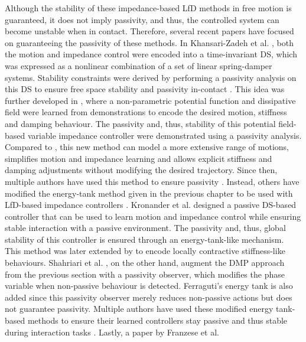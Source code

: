 Although the stability of these impedance-based LfD methods in free motion is guaranteed, it does not imply passivity, and thus, the controlled system can become unstable when in contact. Therefore, several recent papers have focused on guaranteeing the passivity of these methods. In Khansari-Zadeh et al. \cite{khansari-zadehModelingRobotDiscrete2014}, both the motion and impedance control were encoded into a time-invariant DS, which was expressed as a nonlinear combination of a set of linear spring-damper systems. Stability constraints were derived by performing a passivity analysis on this DS to ensure free space stability and passivity in-contact \cite{khansari-zadehModelingRobotDiscrete2014}. This idea was further developed in \cite{khansari-zadehLearningPotentialFunctions2017}, where a non-parametric potential function and dissipative field were learned from demonstrations to encode the desired motion, stiffness and damping behaviour. The passivity and, thus, stability of this potential field-based variable impedance controller were demonstrated using a passivity analysis. Compared to \cite{khansari-zadehModelingRobotDiscrete2014}, this new method can model a more extensive range of motions, simplifies motion and impedance learning and allows explicit stiffness and damping adjustments without modifying the desired trajectory. Since then, multiple authors have used this method to ensure passivity \cite{wilzConstrainedHapticguidedShared2021,rossaRoboticRehabilitationAssistance2021,najafiUsingPotentialField2020,baiReachableWorkspaceRobotassisted2022,huFuzzyAdaptivePassive2023}. Instead, others have modified the energy-tank method given in the previous chapter to be used with LfD-based impedance controllers \cite{kronanderPassiveInteractionControl2016,shahriariAdaptingContactsEnergy2017}. Kronander et al. \cite{kronanderPassiveInteractionControl2016} designed a passive DS-based controller that can be used to learn motion and impedance control while ensuring stable interaction with a passive environment. The passivity and, thus, global stability of this controller is ensured through an energy-tank-like mechanism. This method was later extended by \cite{figueroaLocallyActiveGlobally2022,chenClosedLoopVariableStiffness2021} to encode locally contractive stiffness-like behaviours. Shahriari et al. \cite{shahriariAdaptingContactsEnergy2017}, on the other hand, augment the DMP approach from the previous section with a passivity observer, which modifies the phase variable when non-passive behaviour is detected. Ferraguti's energy tank is also added since this passivity observer merely reduces non-passive actions but does not guarantee passivity. Multiple authors have used these modified energy tank-based methods to ensure their learned controllers stay passive and thus stable during interaction tasks \cite{kastritsiPHRIFrameworkModifying2018,kastritsiProgressiveAutomationDMP2018,dimeasProgressiveAutomationPeriodic2020,papageorgiouKinestheticGuidanceUtilizing2020,krambergerPassivityBasedIterative2018,amanhoudDynamicalSystemApproach2019,enayatiVariableImpedanceForceControl2020,michelBilateralTeleoperationAdaptive2021,wuFrameworkAutonomousImpedance2021,wuLearningDemonstrationInteractive2022,zhaoHybridLearningOptimization2022}. Lastly, a paper by Franzese et al. 